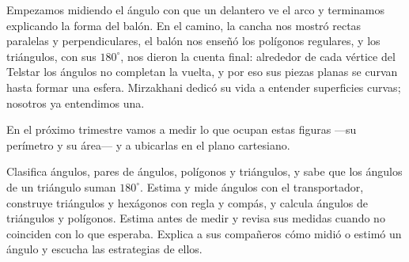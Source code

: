 \documentclass[11pt]{article}
\begin{document}

Empezamos midiendo el ángulo con que un delantero ve el arco y terminamos explicando la forma
del balón. En el camino, la cancha nos mostró rectas paralelas y perpendiculares, el balón nos
enseñó los polígonos regulares, y los triángulos, con sus $180^\circ$, nos dieron la cuenta
final: alrededor de cada vértice del Telstar los ángulos no completan la vuelta, y por eso sus
piezas planas se curvan hasta formar una esfera. Mirzakhani dedicó su vida a entender
superficies curvas; nosotros ya entendimos una.

En el próximo trimestre vamos a medir lo que ocupan estas figuras ---su perímetro y su área--- y
a ubicarlas en el plano cartesiano.

\matrizevaluacion
  {Clasifica ángulos, pares de ángulos, polígonos y triángulos, y sabe que los ángulos de un triángulo suman $180^\circ$.}
  {Estima y mide ángulos con el transportador, construye triángulos y hexágonos con regla y compás, y calcula ángulos de triángulos y polígonos.}
  {Estima antes de medir y revisa sus medidas cuando no coinciden con lo que esperaba.}
  {Explica a sus compañeros cómo midió o estimó un ángulo y escucha las estrategias de ellos.}

\autoevaluacion

\seguimientodocente
\end{document}

